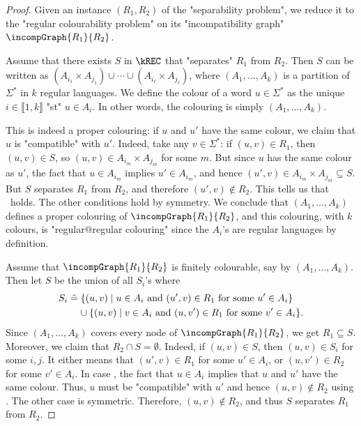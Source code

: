 \begin{proof}

    \AP Given an instance $(R_1,R_2)$ of the "separability problem", we
    reduce it to the "regular colourability problem" on its "incompatibility graph" $\incompGraph{R_1}{R_2}$.

   Assume that there exists $S$ in $\kREC$ that "separates" $R_1$ from $R_2$.
    Then $S$ can be written as $(A_{i_1}\times A_{j_1}) \cup \cdots \cup (A_{i_\ell}\times A_{j_\ell})$, 
    where $(A_1,\hdots,A_k)$ is a partition of $\Sigma^*$ in $k$ regular languages.
   We define the colour of a word $u \in \Sigma^*$ as the unique $i \in \lBrack 1,k \rBrack$
    "st" $u \in A_i$. In other words, the colouring is simply $(A_1,\hdots,A_k)$. 

    This is indeed a proper colouring: if $u$ and $u'$ have the same colour,
    we claim that $u$ is "compatible" with $u'$. Indeed, take any $v \in \Sigma^*$: if $(u,v) \in R_1$,
    then $(u,v) \in S$, so $(u,v) \in A_{i_m}\times A_{j_m}$ for some $m$. But since $u$ has the same colour 
    as $u'$, the fact that $u \in A_{i_m}$ implies $u' \in A_{i_m}$, and hence 
    $(u',v) \in A_{i_m}\times A_{j_m}\subseteq S$.
    But $S$ separates $R_1$ from $R_2$, and therefore $(u',v) \not\in R_2$. This tells us that \compL\ holds. 
    The other conditions hold by symmetry.
    We conclude that $(A_1,\hdots,A_k)$ defines
    a proper colouring of $\incompGraph{R_1}{R_2}$, and this colouring, with $k$ colours, is 
    "regular@regular colouring" since the $A_i$'s are regular languages by definition.

     Assume that $\incompGraph{R_1}{R_2}$ is finitely colourable, say by
    $(A_1,\hdots,A_k)$. Then let $S$ be the union of all $S_i$'s where
    \begin{align*}
        S_{i} & \defeq \{(u,v) \mid u \in A_i \text{ and } (u',v) \in R_1 \text{ for some } u' \in A_i \}\\
&         \hphantom{\defeq~}\cup \{(u,v) \mid v \in A_i \text{ and } (u,v') \in R_1 \text{ for some } v' \in A_i \}.  
    \end{align*}
    Since $(A_1,\hdots,A_k)$ covers every node of $\incompGraph{R_1}{R_2}$, we get $R_1 \subseteq S$.
    Moreover, we claim that $R_2 \cap S = \emptyset$. Indeed, if $(u,v) \in S$,
    then $(u,v) \in S_{i}$ for some $i,j$. It either means that 
    $(u',v) \in R_1$ for some $u' \in A_i$, or  $(u,v') \in R_2$
    for some $v' \in A_i$. In case , the fact that $u \in A_i$ implies that $u$ and $u'$
    have the same colour. Thus, $u$ must be "compatible" with $u'$ and hence
    $(u,v) \not\in R_2$ using \compLpr. The other case is symmetric.
    Therefore, $(u,v) \not\in R_2$, and thus $S$ separates $R_1$ from $R_2$.


\end{proof}
